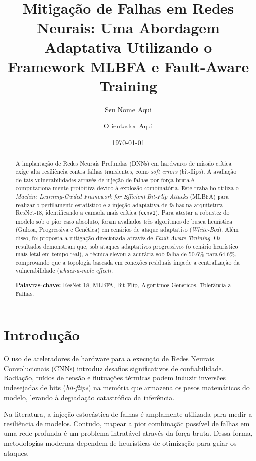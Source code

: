 \documentclass[11pt, a4paper]{article}
\title{\textbf{Mitigação de Falhas em Redes Neurais: Uma Abordagem Adaptativa Utilizando o Framework MLBFA e Fault-Aware Training}}
\author{Seu Nome Aqui \and Orientador Aqui}
\date{\today}
\begin{document}
\maketitle

\begin{abstract}
A implantação de Redes Neurais Profundas (DNNs) em hardwares de missão crítica exige alta resiliência contra falhas transientes, como \textit{soft errors} (bit-flips). A avaliação de tais vulnerabilidades através de injeção de falhas por força bruta é computacionalmente proibitiva devido à explosão combinatória. Este trabalho utiliza o \textit{Machine Learning-Guided Framework for Efficient Bit-Flip Attacks} (MLBFA) para realizar o perfilamento estatístico e a injeção adaptativa de falhas na arquitetura ResNet-18, identificando a camada mais crítica (\texttt{conv1}). Para atestar a robustez do modelo sob o pior caso absoluto, foram avaliados três algoritmos de busca heurística (Gulosa, Progressiva e Genética) em cenários de ataque adaptativo (\textit{White-Box}). Além disso, foi proposta a mitigação direcionada através de \textit{Fault-Aware Training}. Os resultados demonstram que, sob ataques adaptativos progressivos (o cenário heurístico mais letal em tempo real), a técnica elevou a acurácia sob falha de 50.6\% para 64.6\%, comprovando que a topologia baseada em conexões residuais impede a centralização da vulnerabilidade (\textit{whack-a-mole effect}). 

\textbf{Palavras-chave:} ResNet-18, MLBFA, Bit-Flip, Algoritmos Genéticos, Tolerância a Falhas.
\end{abstract}

\section{Introdução}
O uso de aceleradores de hardware para a execução de Redes Neurais Convolucionais (CNNs) introduz desafios significativos de confiabilidade. Radiação, ruídos de tensão e flutuações térmicas podem induzir inversões indesejadas de bits (\textit{bit-flips}) na memória que armazena os pesos matemáticos do modelo, levando à degradação catastrófica da inferência. 

Na literatura, a injeção estocástica de falhas é amplamente utilizada para medir a resiliência de modelos. Contudo, mapear a pior combinação possível de falhas em uma rede profunda é um problema intratável através da força bruta. Dessa forma, metodologias modernas dependem de heurísticas de otimização para guiar os ataques.
\end{document}
